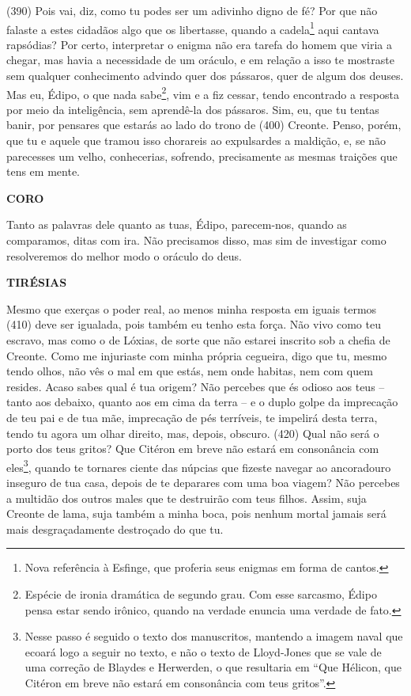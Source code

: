 (390) Pois vai, diz, como tu podes ser um adivinho digno de fé? Por que
não falaste a estes cidadãos algo que os libertasse, quando a
cadela\footnote{Nova referência à Esfinge, que proferia seus enigmas em
  forma de cantos.} aqui cantava rapsódias? Por certo, interpretar o
enigma não era tarefa do homem que viria a chegar, mas havia a
necessidade de um oráculo, e em relação a isso te mostraste sem qualquer
conhecimento advindo quer dos pássaros, quer de algum dos deuses. Mas
eu, Édipo, o que nada sabe\footnote{Espécie de ironia dramática de
  segundo grau. Com esse sarcasmo, Édipo pensa estar sendo irônico,
  quando na verdade enuncia uma verdade de fato.}, vim e a fiz cessar,
tendo encontrado a resposta por meio da inteligência, sem aprendê-la dos
pássaros. Sim, eu, que tu tentas banir, por pensares que estarás ao lado
do trono de (400) Creonte. Penso, porém, que tu e aquele que tramou isso
chorareis ao expulsardes a maldição, e, se não parecesses um velho,
conhecerias, sofrendo, precisamente as mesmas traições que tens em
mente.

\textbf{CORO}

Tanto as palavras dele quanto as tuas, Édipo, parecem-nos, quando as
comparamos, ditas com ira. Não precisamos disso, mas sim de investigar
como resolveremos do melhor modo o oráculo do deus.

\textbf{TIRÉSIAS}

Mesmo que exerças o poder real, ao menos minha resposta em iguais termos
(410) deve ser igualada, pois também eu tenho esta força. Não vivo como
teu escravo, mas como o de Lóxias, de sorte que não estarei inscrito sob
a chefia de Creonte. Como me injuriaste com minha própria cegueira, digo
que tu, mesmo tendo olhos, não vês o mal em que estás, nem onde habitas,
nem com quem resides. Acaso sabes qual é tua origem? Não percebes que és
odioso aos teus -- tanto aos debaixo, quanto aos em cima da terra -- e o
duplo golpe da imprecação de teu pai e de tua mãe, imprecação de pés
terríveis, te impelirá desta terra, tendo tu agora um olhar direito,
mas, depois, obscuro. (420) Qual não será o porto dos teus gritos? Que
Citéron em breve não estará em consonância com eles\footnote{Nesse passo
  é seguido o texto dos manuscritos, mantendo a imagem naval que ecoará
  logo a seguir no texto, e não o texto de Lloyd-Jones que se vale de
  uma correção de Blaydes e Herwerden, o que resultaria em ``Que
  Hélicon, que Citéron em breve não estará em consonância com teus
  gritos''.}, quando te tornares ciente das núpcias que fizeste navegar
ao ancoradouro inseguro de tua casa, depois de te deparares com uma boa
viagem? Não percebes a multidão dos outros males que te destruirão com
teus filhos. Assim, suja Creonte de lama, suja também a minha boca, pois
nenhum mortal jamais será mais desgraçadamente destroçado do que tu.

